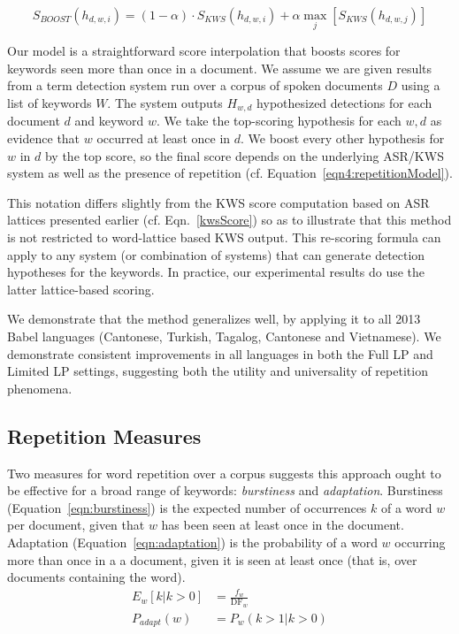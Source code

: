 \begin{equation}
S_{BOOST}(h_{d,w,i}) = (1-\alpha)\cdot S_{KWS}(h_{d,w,i}) + \alpha\max_j \left[S_{KWS}(h_{d,w,j})\right] \label{eqn4:repetitionModel}
\end{equation}

Our model is a straightforward score interpolation that boosts scores for keywords seen more than once in a document.  We assume we are given results from a term detection system run over a corpus of spoken documents $D$ using a list of keywords $W$.  The system outputs $H_{w,d}$ hypothesized detections for each document $d$ and keyword $w$. We take the top-scoring hypothesis for each ${w,d}$ as evidence that $w$ occurred at least once in $d$.  We boost every other hypothesis for $w$ in $d$ by the top score, so the final score depends on the underlying ASR/KWS system as well as the presence of repetition (cf. Equation~\ref{eqn4:repetitionModel}).  

This notation differs slightly from the KWS score computation based on ASR lattices presented earlier (cf. Eqn.~\ref{kwsScore}) so as to illustrate that this method is not restricted to word-lattice based KWS output.  This re-scoring formula can apply to any system (or combination of systems) that can generate detection hypotheses for the keywords.  In practice, our experimental results do use the latter lattice-based scoring. 

We demonstrate that the method generalizes well, by applying it to all 2013 Babel languages (Cantonese, Turkish, Tagalog, Cantonese and Vietnamese).  We demonstrate consistent improvements in all languages in both the Full LP and Limited LP settings, suggesting both the utility and universality of repetition phenomena.


\subsection{Repetition Measures}
\label{sec:repetitionMeasure}
Two measures for word repetition over a corpus suggests this approach ought to be effective for a broad range of keywords: \textit{burstiness} and \textit{adaptation}.  Burstiness (Equation~\ref{eqn:burstiness}) is the expected number of occurrences $k$ of a word $w$ per document, given that $w$ has been seen at least once in the document.  Adaptation (Equation~\ref{eqn:adaptation}) is the probability of a word $w$ occurring more than once in a a document, given it is seen at least once (that is, over documents containing the word).
\begin{align}
E_w[k|k>0] &= \frac{f_w}{\mathrm{DF}_w} \label{eqn:burstiness}\\
P_{adapt}(w) &= P_w(k>1|k>0)  \label{eqn:adaptation}
\end{align}

